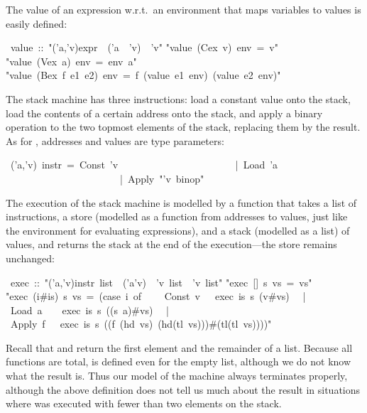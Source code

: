 \begin{isabelle}
\begin{isamarkuptext}
The value of an expression w.r.t.\ an environment that maps variables to
values is easily defined:%
\end{isamarkuptext}%
~value~::~{"}('a,'v)expr~{\isasymRightarrow}~('a~{\isasymRightarrow}~'v)~{\isasymRightarrow}~'v{"}\isanewline
{}\isanewline
{"}value~(Cex~v)~env~=~v{"}\isanewline
{"}value~(Vex~a)~env~=~env~a{"}\isanewline
{"}value~(Bex~f~e1~e2)~env~=~f~(value~e1~env)~(value~e2~env){"}%
\begin{isamarkuptext}%
The stack machine has three instructions: load a constant value onto the
stack, load the contents of a certain address onto the stack, and apply a
binary operation to the two topmost elements of the stack, replacing them by
the result. As for , addresses and values are type parameters:%
\end{isamarkuptext}%
~('a,'v)~instr~=~Const~'v\isanewline
~~~~~~~~~~~~~~~~~~~~~~~|~Load~'a\isanewline
~~~~~~~~~~~~~~~~~~~~~~~|~Apply~{"}'v~binop{"}%
\begin{isamarkuptext}%
The execution of the stack machine is modelled by a function
 that takes a list of instructions, a store (modelled as a
function from addresses to values, just like the environment for
evaluating expressions), and a stack (modelled as a list) of values,
and returns the stack at the end of the execution---the store remains
unchanged:%
\end{isamarkuptext}%
~exec~::~{"}('a,'v)instr~list~{\isasymRightarrow}~('a{\isasymRightarrow}'v)~{\isasymRightarrow}~'v~list~{\isasymRightarrow}~'v~list{"}\isanewline
{}\isanewline
{"}exec~[]~s~vs~=~vs{"}\isanewline
{"}exec~(i\#is)~s~vs~=~(case~i~of\isanewline
~~~~Const~v~~{\isasymRightarrow}~exec~is~s~(v\#vs)\isanewline
~~|~Load~a~~~{\isasymRightarrow}~exec~is~s~((s~a)\#vs)\isanewline
~~|~Apply~f~~{\isasymRightarrow}~exec~is~s~((f~(hd~vs)~(hd(tl~vs)))\#(tl(tl~vs)))){"}%
\begin{isamarkuptext}%
\noindent
Recall that  and 
return the first element and the remainder of a list.
Because all functions are total,  is defined even for the empty
list, although we do not know what the result is. Thus our model of the
machine always terminates properly, although the above definition does not
tell us much about the result in situations where  was executed
with fewer than two elements on the stack.


\end{isamarkuptext}
\end{isabelle}
